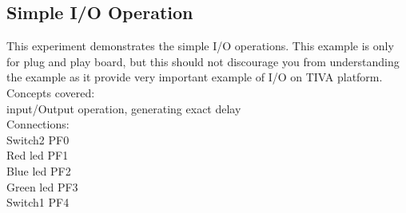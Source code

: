 \documentclass[a4paper,10pt,oneside]{article}
\begin{document}
		\subsection{\huge \textbf{Simple I/O Operation}}{		
		This experiment demonstrates the simple I/O operations.
		This example is only for plug and play board, but this should not discourage
		you from understanding the example as it provide very important example of I/O
		on TIVA platform.\\
		Concepts covered:\\
		input/Output operation, generating exact delay
		\\
		Connections:\\
		Switch2 PF0\\
		Red led PF1\\
		Blue led PF2\\
		Green led PF3\\
		Switch1 PF4\\
		
}
\end{document}
